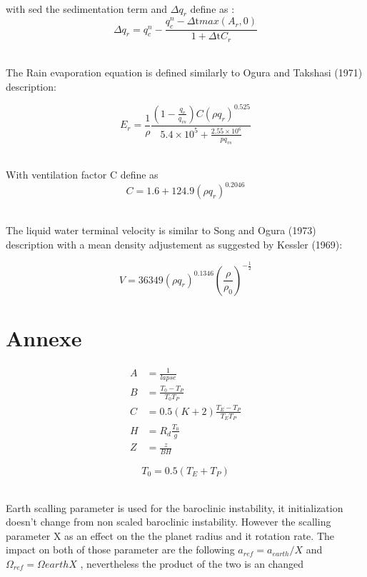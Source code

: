 \documentclass[times,doublespace]{fldauth}
\begin{document}
~\\with sed the sedimentation term and $\Delta q_r$ define as :
\begin{equation}
\Delta q_r=q_c^n-\frac{q_c^n-\Delta \text{t} max(A_r,0)}{1+\Delta \text{t} C_r}
\end{equation}






~\\ The Rain evaporation equation is defined similarly to Ogura and Takshasi (1971) description:

\begin{equation}
E_r=\frac{1}{\rho}\frac{\left(1-\frac{q_v}{q_{vs}}\right)C(\rho q_r)^{0.525}}{5.4\times10^5+\frac{2.55\times10^6}{pq_{vs}}}
\end{equation}



~\\ With ventilation factor C define as 
\begin{equation}
C=1.6+124.9(\rho q_r)^{0.2046}
\label{venti}
\end{equation}



~\\ The liquid water terminal velocity is similar to Song and Ogura (1973) description with a mean density adjustement as suggested by Kessler (1969):

\begin{equation}
V=36349(\rho q_r)^{0.1346}\left(\frac{\rho}{\rho_0}\right)^{-\frac{1}{2}}
\end{equation}



\clearpage 
\appendix
\section{Annexe}

\begin{align*}
A&= \frac{1}{lapse} \\
B&=\frac{T_0-T_P}{T_0T_P} \\
C&=0.5(K+2) \frac{T_E-T_P}{T_ET_P} \\
H&=R_d\frac{T_0} {g}\\
Z&=\frac{z}{B H}  
\end{align*}


\begin{equation*}
T_0=0.5(T_E +T_P)
\end{equation*}

~\\Earth scalling parameter is used for the baroclinic instability, it initialization doesn't change from non scaled baroclinic instability. However the scalling parameter X as an effect on the the planet radius and it rotation rate. The impact on both of those parameter are the following $a_{ref}=a_{earth}/X$ and $\Omega_{ref}=\Omega{earth}X$ , nevertheless the product of the two is an changed 
\end{document}
